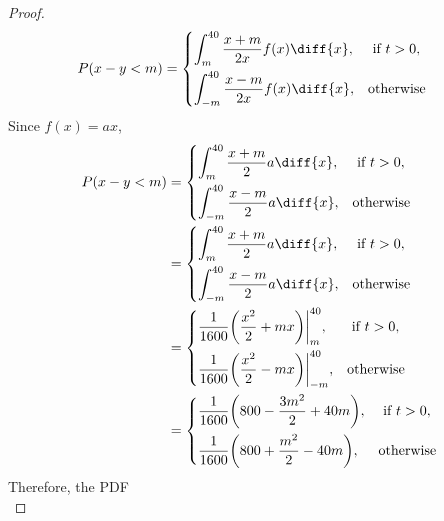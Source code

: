 \documentclass[paper=usletter, fontsize=12pt]{article}
\begin{document}
\begin{enumerate}
\begin{enumerate}
\begin{proof}
                \begin{align*}
                    P(x-y<m)
                    & = \begin{dcases}
                        \int_{m}^{40}\frac{x+m}{2x}f(x)\diff{x}, & \text{ if } t > 0,\\
                        \int_{-m}^{40}\frac{x-m}{2x}f(x)\diff{x}, & \text{otherwise}
                    \end{dcases}
                \end{align*}
                \endgroup
                Since $f(x) = ax$,
                \begin{align*}
                    P(x-y<m)
                    & = \begin{dcases}
                        \int_{m}^{40}\frac{x+m}{2}a\diff{x}, & \text{ if } t > 0,\\
                        \int_{-m}^{40}\frac{x-m}{2}a\diff{x}, & \text{otherwise}
                    \end{dcases} \\
                    & = \begin{dcases}
                        \int_{m}^{40}\frac{x+m}{2}a\diff{x}, & \text{ if } t > 0,\\
                        \int_{-m}^{40}\frac{x-m}{2}a\diff{x}, & \text{otherwise}
                    \end{dcases} \\
                    & = \begin{dcases}
                        \frac{1}{1600}\bigg(\frac{x^2}{2}+mx\bigg)\bigg\vert_{m}^{40}, & \text{ if } t > 0,\\
                        \frac{1}{1600}\bigg(\frac{x^2}{2}-mx\bigg)\bigg\vert_{-m}^{40}, & \text{otherwise}
                    \end{dcases} \\
                    & = \begin{dcases}
                        \frac{1}{1600}\bigg(800-\frac{3m^2}{2}+40m\bigg), & \text{ if } t > 0,\\
                        \frac{1}{1600}\bigg(800+\frac{m^2}{2}-40m\bigg), & \text{otherwise}
                    \end{dcases}
                \end{align*}
                \endgroup
                Therefore, the PDF
                \begin{equation*}

\end{equation*}
\end{proof}
\end{enumerate}
\end{enumerate}
\end{document}
